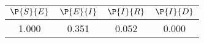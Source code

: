 \begin{tabular}{cccc}
\hline
$\P{S}{E}$&$\P{E}{I}$&$\P{I}{R}$&$\P{I}{D}$\\
\hline
1.000&0.351&0.052&0.000\\
\hline
\end{tabular}